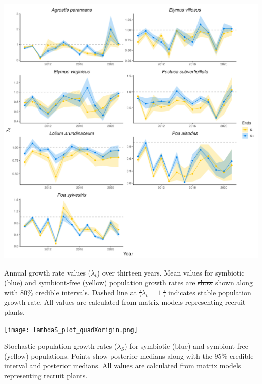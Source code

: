 \documentclass[lineno, sn-basic]{sn-jnl}%
\providecommand{\DIFadd}[1]{{\protect\color{blue}#1}} %
\providecommand{\DIFdel}[1]{{\protect\color{red}\protect\scriptsize\sout{#1}}}
\providecommand{\DIFadd}[1]{{\protect\color{blue}\uwave{#1}}} %
\providecommand{\DIFdel}[1]{{\protect\color{red}\sout{#1}}}                      %
\providecommand{\DIFaddbegin}{} %
\providecommand{\DIFaddend}{} %
\providecommand{\DIFdelbegin}{} %
\providecommand{\DIFdelend}{} %
\providecommand{\DIFaddFL}[1]{\DIFadd{#1}} %
\providecommand{\DIFdelFL}[1]{\DIFdel{#1}} %
\providecommand{\DIFaddbeginFL}{} %
\providecommand{\DIFaddendFL}{} %
\providecommand{\DIFdelbeginFL}{} %
\providecommand{\DIFdelendFL}{} %
\newcommand{\DIFscaledelfig}{0.5}
\newlength{\DIFdelgraphicswidth} %
\newlength{\DIFdelgraphicsheight} %
\newcommand{\DIFaddincludegraphics}[2][]{{\color{blue}\fbox{\DIFOincludegraphics[#1]{#2}}}} %
\newcommand{\DIFdelincludegraphics}[2][]{%
\sbox{\DIFdelgraphicsbox}{\DIFOincludegraphics[#1]{#2}}%
\settoboxwidth{\DIFdelgraphicswidth}{\DIFdelgraphicsbox} %
\settoboxtotalheight{\DIFdelgraphicsheight}{\DIFdelgraphicsbox} %
\scalebox{\DIFscaledelfig}{%
\parbox[b]{\DIFdelgraphicswidth}{\usebox{\DIFdelgraphicsbox}\\[-\baselineskip] \rule{\DIFdelgraphicswidth}{0em}}\llap{\resizebox{\DIFdelgraphicswidth}{\DIFdelgraphicsheight}{%
\setlength{\unitlength}{\DIFdelgraphicswidth}%
\begin{picture}(1,1)%
\thicklines\linethickness{2pt} %
{\color[rgb]{1,0,0}\put(0,0){\framebox(1,1){}}}%
{\color[rgb]{1,0,0}\put(0,0){\line( 1,1){1}}}%
{\color[rgb]{1,0,0}\put(0,1){\line(1,-1){1}}}%
\end{picture}%
}\hspace*{3pt}}} %
} %
\DeclareRobustCommand{\DIFaddbegin}{\DIFOaddbegin \let\includegraphics\DIFaddincludegraphics} %
\DeclareRobustCommand{\DIFaddend}{\DIFOaddend \let\includegraphics\DIFOincludegraphics} %
\DeclareRobustCommand{\DIFdelbegin}{\DIFOdelbegin \let\includegraphics\DIFdelincludegraphics} %
\DeclareRobustCommand{\DIFdelend}{\DIFOaddend \let\includegraphics\DIFOincludegraphics} %
\DeclareRobustCommand{\DIFaddbeginFL}{\DIFOaddbeginFL \let\includegraphics\DIFaddincludegraphics} %
\DeclareRobustCommand{\DIFaddendFL}{\DIFOaddendFL \let\includegraphics\DIFOincludegraphics} %
\DeclareRobustCommand{\DIFdelbeginFL}{\DIFOdelbeginFL \let\includegraphics\DIFdelincludegraphics} %
\DeclareRobustCommand{\DIFdelendFL}{\DIFOaddendFL \let\includegraphics\DIFOincludegraphics} %
\begin{document}
\begin{myfigure}[H]
\DIFdelendFL \includegraphics[width=\linewidth]{lambda_timeseries_plot.png}
	\DIFdelbeginFL %
\DIFdelendFL \DIFaddbeginFL \caption[Annual growth rate values ($\lambda_{t}$) over thirteen years]{\DIFaddendFL Annual growth rate values ($\lambda_{t}$) over thirteen years. Mean values for symbiotic (blue) and symbiont-free (yellow) population growth rates are \DIFdelbeginFL \DIFdelFL{show }\DIFdelendFL \DIFaddbeginFL \DIFaddFL{shown }\DIFaddendFL along with $80\%$ credible intervals. Dashed line at \DIFdelbeginFL \DIFdelFL{(}\DIFdelendFL $\lambda_{t} = 1$ \DIFdelbeginFL \DIFdelFL{) }\DIFdelendFL indicates stable population growth rate. All values are calculated from matrix models representing recruit plants.}
\DIFdelbeginFL %
\DIFdelend \DIFaddbegin \end{myfigure}
\DIFaddend 


\DIFdelbegin %
\DIFdelendFL \DIFaddbeginFL \begin{myfigure}[H]
	\DIFaddendFL \centering
	\DIFdelbeginFL %
\DIFdelendFL \DIFaddbeginFL \texttt{[image: lambdaS\_plot\_quadXorigin.png]}
	\caption[Stochastic population growth rates ($\lambda_S$) for symbiotic and symbiont-free populations]{\DIFaddFL{Stochastic population growth rates }\DIFaddendFL (\DIFaddbeginFL \DIFaddFL{$\lambda_S$) for symbiotic (blue) and symbiont-free (yellow) populations. Points show posterior medians along with the 95\% credible interval and posterior medians. All values are calculated from matrix models representing recruit plants.}}
\end{myfigure}
\end{document}
